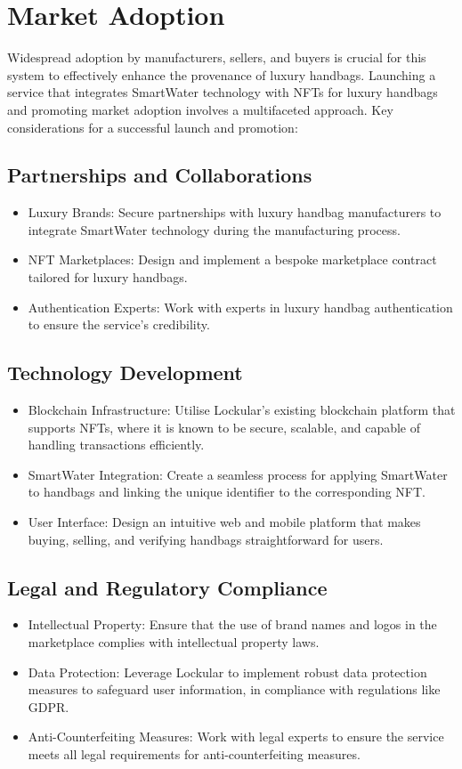 \documentclass{tufte-handout}
\begin{document}
\section{Market Adoption}\label{sec:page-layout}
Widespread adoption by manufacturers, sellers, and buyers is crucial for this system to effectively enhance the provenance of luxury handbags.
Launching a service that integrates SmartWater technology with NFTs for luxury handbags and promoting market adoption involves a multifaceted approach.
Key considerations for a successful launch and promotion:
\subsection{Partnerships and Collaborations}\label{sec:page-layout}
\begin{itemize}
    \item Luxury Brands: Secure partnerships with luxury handbag manufacturers to integrate SmartWater technology during the manufacturing process.
    \item NFT Marketplaces: Design and implement a bespoke marketplace contract tailored for luxury handbags.
    \item Authentication Experts: Work with experts in luxury handbag authentication to ensure the service's credibility.
\end{itemize}
\subsection{Technology Development}\label{sec:page-layout}
\begin{itemize}
    \item Blockchain Infrastructure: Utilise Lockular's existing blockchain platform that supports NFTs, where it is known to be secure, scalable,
    and capable of handling transactions efficiently.
    \item SmartWater Integration: Create a seamless process for applying SmartWater to handbags and linking the unique identifier to the corresponding NFT.
    \item User Interface: Design an intuitive web and mobile platform that makes buying, selling, and verifying handbags straightforward for users.
\end{itemize}
\subsection{Legal and Regulatory Compliance}\label{sec:page-layout}
\begin{itemize}
    \item Intellectual Property: Ensure that the use of brand names and logos in the marketplace complies with intellectual property laws.
    \item Data Protection: Leverage Lockular to implement robust data protection measures to safeguard user information, in compliance with regulations like GDPR.
    \item Anti-Counterfeiting Measures: Work with legal experts to ensure the service meets all legal requirements for anti-counterfeiting measures.
\end{itemize}
\end{document}
